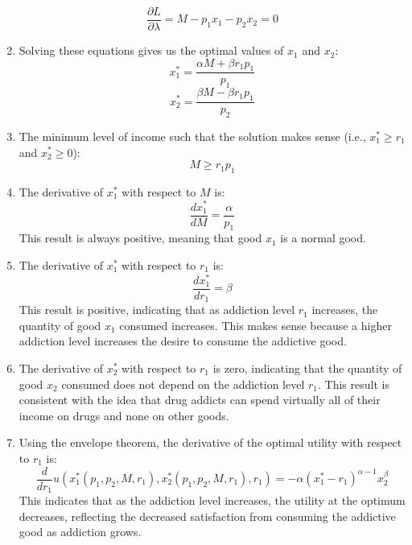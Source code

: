 \documentclass[UTF8,titlepage]{article}
\numberwithin{figure}{section}
\begin{document}
\begin{enumerate}
    \[\frac{\partial L}{\partial \lambda} = M - p_1 x_1 - p_2 x_2 = 0\]
    \item Solving these equations gives us the optimal values of $x_1$ and $x_2$:
    \[x^*_1 = \frac{\alpha M + \beta r_1 p_1}{p_1}\]
    \[x^*_2 = \frac{\beta M - \beta r_1 p_1}{p_2}\]
    \item The minimum level of income such that the solution makes sense (i.e., $x_1^* \geq r_1$ and $x_2^* \geq 0$):
    \[M \geq r_1 p_1\]
    \item The derivative of $x_1^*$ with respect to $M$ is:
    \[\frac{dx^*_1}{dM} = \frac{\alpha}{p_1}\]
    This result is always positive, meaning that good $x_1$ is a normal good.
    \item The derivative of $x_1^*$ with respect to $r_1$ is:
    \[\frac{dx^*_1}{dr_1} = \beta \]
    This result is positive, indicating that as addiction level $r_1$ increases, the quantity of good $x_1$ consumed increases. This makes sense because a higher addiction level increases the desire to consume the addictive good.
    \item The derivative of $x_2^*$ with respect to $r_1$ is zero, indicating that the quantity of good $x_2$ consumed does not depend on the addiction level $r_1$. This result is consistent with the idea that drug addicts can spend virtually all of their income on drugs and none on other goods.
    \item Using the envelope theorem, the derivative of the optimal utility with respect to $r_1$ is:
    \[\frac{d}{dr_1} u(x_1^*(p_1, p_2, M, r_1), x_2^*(p_1, p_2, M, r_1), r_1) = -\alpha(x_1^* - r_1)^{\alpha-1} x_2^{\beta}\]
    This indicates that as the addiction level increases, the utility at the optimum decreases, reflecting the decreased satisfaction from consuming the addictive good as addiction grows.
\end{enumerate}
\clearpage
\end{document}
